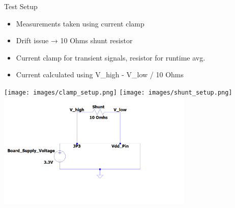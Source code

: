 \begin{frame}{Test Setup}
    \begin{itemize}
        \item Measurements taken using current clamp
        \item Drift issue → 10 Ohms shunt resistor
        \item Current clamp for transient signals, resistor for runtime avg.
        \item Current calculated using V\_high - V\_low / 10 Ohms
    \end{itemize}  
    \texttt{[image: images/clamp\_setup.png]}
    \texttt{[image: images/shunt\_setup.png]}
    \includegraphics[height=0.35\textheight,width=0.7\textwidth,keepaspectratio]{images/shunt.png}
\end{frame}


